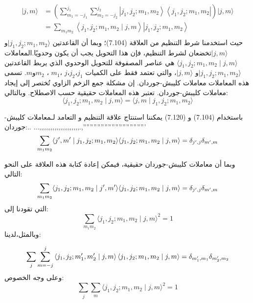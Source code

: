\begin{equation}
	\begin{aligned}
	 |j, m\rangle &=\left(\sum_{m_1=-j_1}^{j_1} \sum_{m_2=-j_2}^{j_2}\left|j_1, j_2 ; m_1, m_2\right\rangle\left\langle j_1, j_2 ; m_1, m_2\right|\right)|j, m\rangle \\ &
	 =\sum_{m_1 m_2}\left\langle j_1, j_2 ; m_1, m_2 \mid j, m\right\rangle\left|j_1, j_2 ; m_1, m_2\right\rangle \\
	 \end{aligned}
\end{equation}
حيث استخدمنا شرط التنظيم من العلاقة (7.104)؛ وبما أن القاعدتين $\mid j_1, j_2 ; m_1, m_2\rangle$و 
$ |j, m\rangle$تخضعان لشرط التنظيم، فإن هذا التحويل يجب أن يكون وحدويًا.المعاملات
  $\langle j_1, j_2 ; m_1, m_2 \mid j, m\rangle$
هي عناصر المصفوفة للتحويل الوحدوي الذي يربط القاعدتين $\mid j_1, j_2 ; m_1, m_2\rangle$و 
$ |j, m\rangle$،
 والتي تعتمد فقط على الكميات $j_1 $،$j_2 $،$j$ ،$m_1$ ، $m_2 $و$m$. تسمى هذه المعاملات معاملات كليبش-جوردان. إن مشكلة جمع الزخم الزاوي تُختصر إلى إيجاد معاملات كليبش-جوردان. تعتبر هذه المعاملات حقيقية حسب الاصطلاح. وبالتالي:
 \begin{equation}
 	\langle j_1, j_2 ; m_1, m_2 \mid j, m\rangle=\langle j, m\mid j_1, j_2 ; m_1, m_2 \rangle
 \end{equation}

باستخدام (7.104) و (7.120) يمكننا استنتاج علاقة التنظيم و التعامد لـمعاملات كليبش-جوردان:.. ...,,,,,,,,,,,,,,,,,,,,,.,'''''''''''''''''''''''''''''''''''
\begin{equation}
\sum_{m_1 m_2}	\langle j^{\prime}, m^{\prime}\mid j_1, j_2 ; m_1, m_2 \rangle\langle j_1, j_2 ; m_1, m_2 \mid j, m\rangle=\delta_{j^{\prime}, j} \delta_{m^{\prime}, m} \\
\end{equation}

وبما أن معاملات كليبش-جوردان حقيقية، فيمكن إعادة كتابة هذه العلاقة على النحو التالي:
\begin{equation}
	\sum_{m_1 m_2}	\langle j_1, j_2 ; m_1, m_2\mid  j^{\prime}, m^{\prime}\rangle\langle j_1, j_2 ; m_1, m_2 \mid j, m\rangle=\delta_{j^{\prime}, j} \delta_{m^{\prime}, m} \\
\end{equation}
التي تقودنا إلى:
\begin{equation}
	\sum_{m_1 m_2}\langle j_1, j_2 ; m_1, m_2 \mid j, m\rangle^2=1
\end{equation}
وبالمثل،لدينا:

\begin{equation}
 \sum_j \sum_{m=-j}^j\left\langle j_1, j_2 ; m_1^{\prime}, m_2^{\prime} \mid j, m\right\rangle\left\langle j_1, j_2 ; m_1, m_2 \mid j, m\right\rangle=\delta_{m_1^{\prime}, m_1} \delta_{m_2^{\prime}, m_2} \\ 	
\end{equation}
وعلى وجه الخصوص:
\begin{equation}
	 \sum_j \sum_{m}\langle j_1, j_2 ; m_1, m_2 \mid j, m\rangle^2=1
\end{equation}

